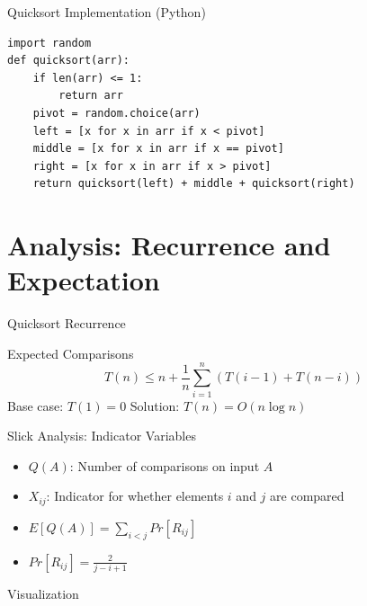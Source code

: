 \documentclass[aspectratio=169]{beamer}
\begin{document}
\begin{frame}[fragile]{Quicksort Implementation (Python)}
  \begin{lstlisting}
import random
def quicksort(arr):
    if len(arr) <= 1:
        return arr
    pivot = random.choice(arr)
    left = [x for x in arr if x < pivot]
    middle = [x for x in arr if x == pivot]
    right = [x for x in arr if x > pivot]
    return quicksort(left) + middle + quicksort(right)
  \end{lstlisting}
\end{frame}

\section{Analysis: Recurrence and Expectation}
\begin{frame}{Quicksort Recurrence}
  \begin{block}{Expected Comparisons}
    \[
      T(n) \leq n + \frac{1}{n} \sum_{i=1}^n (T(i-1) + T(n-i))
    \]
    \pause
    Base case: $T(1) = 0$
    \pause
    Solution: $T(n) = O(n \log n)$
  \end{block}
\end{frame}

\begin{frame}{Slick Analysis: Indicator Variables}
  \begin{itemize}
    \item $Q(A)$: Number of comparisons on input $A$
          \pause
    \item $X_{ij}$: Indicator for whether elements $i$ and $j$ are compared
          \pause
    \item $E[Q(A)] = \sum_{i<j} Pr[R_{ij}]$
          \pause
    \item $Pr[R_{ij}] = \frac{2}{j-i+1}$
  \end{itemize}
  \pause
  \begin{block}{Visualization}
    \begin{center}
    \end{center}
  \end{block}
\end{frame}
\end{document}
